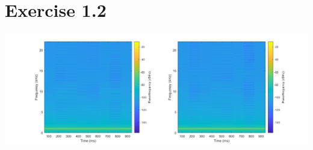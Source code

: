 \documentclass[12pt]{article}
\begin{document}
\section*{Exercise 1.2}
\includegraphics{spectograms}
 
 
\end{document}

